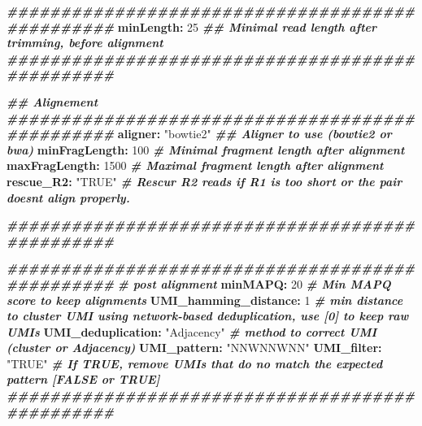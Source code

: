 \documentclass[
]{article}
\newenvironment{Shaded}{\begin{snugshade}}{\end{snugshade}}
\newcommand{\AttributeTok}[1]{\textcolor[rgb]{0.74,0.68,0.62}{#1}}
\newcommand{\CommentTok}[1]{\textcolor[rgb]{0.00,0.40,1.00}{\textbf{\textit{#1}}}}
\newcommand{\DecValTok}[1]{\textcolor[rgb]{0.27,0.67,0.26}{#1}}
\newcommand{\FunctionTok}[1]{\textcolor[rgb]{1.00,0.58,0.35}{\textbf{#1}}}
\newcommand{\KeywordTok}[1]{\textcolor[rgb]{0.26,0.66,0.93}{\textbf{#1}}}
\newcommand{\StringTok}[1]{\textcolor[rgb]{0.02,0.61,0.04}{#1}}
\begin{document}
\begin{Shaded}
\begin{Highlighting}[]
\CommentTok{\#\#\#\#\#\#\#\#\#\#\#\#\#\#\#\#\#\#\#\#\#\#\#\#\#\#\#\#\#\#\#\#\#\#\#\#\#\#\#\#\#\#\#\#\#\#\#\#}
\FunctionTok{minLength}\KeywordTok{:}\AttributeTok{ }\DecValTok{25}\CommentTok{ \#\# Minimal read length after trimming, before alignment}
\CommentTok{\#\#\#\#\#\#\#\#\#\#\#\#\#\#\#\#\#\#\#\#\#\#\#\#\#\#\#\#\#\#\#\#\#\#\#\#\#\#\#\#\#\#\#\#\#\#\#\#}

\CommentTok{\#\# Alignement }
\CommentTok{\#\#\#\#\#\#\#\#\#\#\#\#\#\#\#\#\#\#\#\#\#\#\#\#\#\#\#\#\#\#\#\#\#\#\#\#\#\#\#\#\#\#\#\#\#\#\#\#}
\FunctionTok{aligner}\KeywordTok{:}\AttributeTok{ }\StringTok{"bowtie2"}\CommentTok{   \#\# Aligner to use (bowtie2 or bwa)}
\FunctionTok{minFragLength}\KeywordTok{:}\AttributeTok{ }\DecValTok{100}\CommentTok{         \# Minimal fragment length after alignment}
\FunctionTok{maxFragLength}\KeywordTok{:}\AttributeTok{ }\DecValTok{1500}\CommentTok{        \# Maximal fragment length after alignment }
\FunctionTok{rescue\_R2}\KeywordTok{:}\AttributeTok{ }\StringTok{"TRUE"}\CommentTok{     \# Rescur R2 reads if R1 is too short or the pair doesn\textquotesingle{}t align properly.}

\CommentTok{\#\#\#\#\#\#\#\#\#\#\#\#\#\#\#\#\#\#\#\#\#\#\#\#\#\#\#\#\#\#\#\#\#\#\#\#\#\#\#\#\#\#\#\#\#\#\#\#}

\CommentTok{\#\#\#\#\#\#\#\#\#\#\#\#\#\#\#\#\#\#\#\#\#\#\#\#\#\#\#\#\#\#\#\#\#\#\#\#\#\#\#\#\#\#\#\#\#\#\#\#}
\CommentTok{\# post alignment}
\FunctionTok{minMAPQ}\KeywordTok{:}\AttributeTok{ }\DecValTok{20}\CommentTok{                      \# Min MAPQ score to keep alignments }
\FunctionTok{UMI\_hamming\_distance}\KeywordTok{:}\AttributeTok{ }\DecValTok{1}\CommentTok{         \# min distance to cluster UMI using network{-}based deduplication, use [0] to keep raw UMIs}
\FunctionTok{UMI\_deduplication}\KeywordTok{:}\AttributeTok{ }\StringTok{"Adjacency"}\CommentTok{  \# method to correct UMI (cluster or Adjacency)}
\FunctionTok{UMI\_pattern}\KeywordTok{:}\AttributeTok{ }\StringTok{"NNWNNWNN"}\AttributeTok{  }
\FunctionTok{UMI\_filter}\KeywordTok{:}\AttributeTok{ }\StringTok{"TRUE"}\CommentTok{              \# If TRUE, remove UMIs that do no match the expected pattern [FALSE or TRUE]}
\CommentTok{\#\#\#\#\#\#\#\#\#\#\#\#\#\#\#\#\#\#\#\#\#\#\#\#\#\#\#\#\#\#\#\#\#\#\#\#\#\#\#\#\#\#\#\#\#\#\#\#}



\end{Highlighting}
\end{Shaded}
\end{document}
